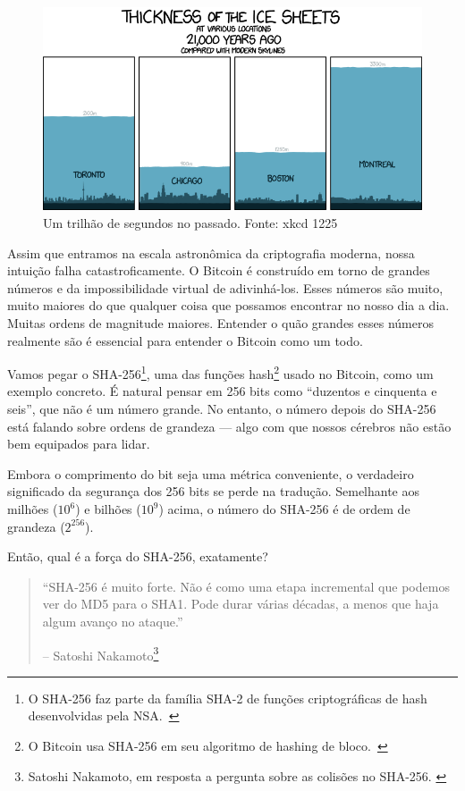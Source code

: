 \begin{figure}
  \includegraphics{assets/images/xkcd-1225.png}
  \caption{Um trilhão de segundos no passado. Fonte: xkcd 1225}
  \label{fig:xkcd-1225}
\end{figure}

Assim que entramos na escala astronômica da criptografia moderna, nossa intuição falha catastroficamente. O Bitcoin é construído em torno de grandes números e da impossibilidade virtual de adivinhá-los. Esses números são muito, muito maiores do que qualquer coisa que possamos encontrar no nosso dia a dia. Muitas ordens de magnitude maiores. Entender o quão grandes esses números realmente são é essencial para entender o Bitcoin como um todo.

Vamos pegar o SHA-256\footnote{O SHA-256 faz parte da família SHA-2 de funções criptográficas de hash desenvolvidas pela NSA.~\cite{wiki:sha2}}, uma das funções hash\footnote{O Bitcoin usa SHA-256 em seu algoritmo de hashing de bloco.~\cite{btcwiki:block-hashing}} usado no Bitcoin, como um exemplo concreto. É natural pensar em 256 bits como \enquote{duzentos e cinquenta e seis}, que não é um número grande. No entanto, o número depois do SHA-256 está falando sobre ordens de grandeza --- algo com que nossos cérebros não estão bem equipados para lidar.

Embora o comprimento do bit seja uma métrica conveniente, o verdadeiro significado da segurança dos 256 bits se perde na tradução. Semelhante aos milhões ($10^6$) e bilhões ($10^9$) acima, o número do SHA-256 é de ordem de grandeza ($2^{256}$).

Então, qual é a força do SHA-256, exatamente?

\begin{quotation}\begin{samepage}
\enquote{SHA-256 é muito forte. Não é como uma etapa incremental que podemos ver do MD5 para o SHA1. Pode durar várias décadas, a menos que haja algum avanço no ataque.}
\begin{flushright} -- Satoshi Nakamoto\footnote{Satoshi Nakamoto, em resposta a pergunta sobre as colisões no SHA-256. \cite{satoshi-sha256}}
\end{flushright}\end{samepage}\end{quotation}


